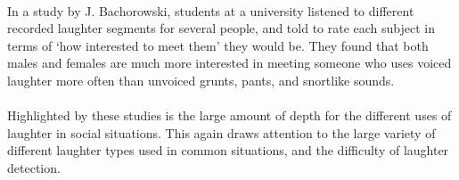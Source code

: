 \documentclass[a4paper,11pt,notitlepage]{article}
\begin{document}
\\
In a study by J. Bachorowski, students at a university listened to different recorded laughter segments for several people, and told to rate each subject in terms of `how interested to meet them' they would be. They found that both males and females are much more interested in meeting someone who uses voiced laughter more often than unvoiced grunts, pants, and snortlike sounds.\cite{bachorowski2001not}\\
\\
Highlighted by these studies is the large amount of depth for the different uses of laughter in social situations. This again draws attention to the large variety of different laughter types used in common situations, and the difficulty of laughter detection.


\end{document}
